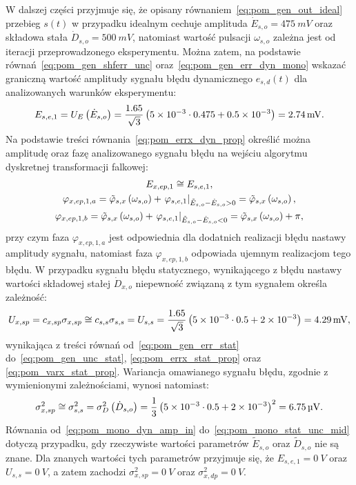 W dalszej części przyjmuje się, że opisany równaniem~\eqref{eq:pom_gen_out_ideal} przebieg $s(t)$ w przypadku idealnym cechuje amplituda $\dot{E}_{s,o} = \qty{475}{mV}$ oraz składowa stała $\dot{D}_{s,o} = \qty{500}{mV}$, natomiast wartość pulsacji $\omega_{s,o}$ zależna jest od iteracji przeprowadzonego eksperymentu. Można zatem, na podstawie równań~\eqref{eq:pom_gen_shferr_unc} oraz~\eqref{eq:pom_gen_err_dyn_mono} wskazać graniczną wartość amplitudy sygnału błędu dynamicznego $e_{s,d}(t)$ dla analizowanych warunków eksperymentu:
\begin{equation}
E_{s,e,1} = U_{E} \left(\dot{E}_{s,o}\right) = \frac{1.65}{\sqrt{3}} \left(\num{5e-3} \cdot 0.475 + \num{0.5e-3}\right) = \qty{2.74}{mV} \label{eq:pom_mono_dyn_amp_in}.
\end{equation}
Na podstawie treści równania~\eqref{eq:pom_errx_dyn_prop} określić można amplitudę oraz fazę analizowanego sygnału błędu na wejściu algorytmu dyskretnej transformacji falkowej:
\begin{gather}
E_{x,ep,1} \cong E_{s,e,1} \label{eq:pom_mono_dyn_prop_amp_mid}, \\
\varphi_{x,ep,1,a} = \tilde{\varphi}_{s,x} \left(\omega_{s,o}\right) + \left. \varphi_{s,e,1} \right|_{\tilde{E}_{s,o} - \dot{E}_{s,o} > 0} = \tilde{\varphi}_{s,x} \left(\omega_{s,o}\right) \label{eq:pom_mono_dyn_prop_phi_mid_a}, \\
\varphi_{x,ep,1,b} = \tilde{\varphi}_{s,x} \left(\omega_{s,o}\right) + \left. \varphi_{s,e,1} \right|_{\tilde{E}_{s,o} - \dot{E}_{s,o} < 0} = \tilde{\varphi}_{s,x} \left(\omega_{s,o}\right) + \pi \label{eq:pom_mono_dyn_prop_phi_mid_b},
\end{gather}
przy czym faza $\varphi_{x,ep,1,a}$ jest odpowiednia dla dodatnich realizacji błędu nastawy amplitudy sygnału, natomiast faza $\varphi_{x,ep,1,b}$ odpowiada ujemnym realizacjom tego błędu. W przypadku sygnału błędu statycznego, wynikającego z błędu nastawy wartości składowej stałej $\dot{D}_{x,o}$ niepewność związaną z tym sygnałem określa zależność:
\begin{equation}
U_{x,sp} = c_{x,sp} \sigma_{x,sp} \cong c_{s,s} \sigma_{s,s} = U_{s,s} = \frac{1.65}{\sqrt{3}} \left(\num{5e-3} \cdot 0.5 + \num{2e-3}\right) = \qty{4.29}{mV} \label{eq:pom_mono_stat_unc_mid},
\end{equation}
wynikająca z treści równań od~\eqref{eq:pom_gen_err_stat} do~\eqref{eq:pom_gen_unc_stat}, \eqref{eq:pom_errx_stat_prop} oraz \eqref{eq:pom_varx_stat_prop}. Wariancja omawianego sygnału błędu, zgodnie z wymienionymi zależnościami, wynosi natomiast:
\begin{equation}
\sigma_{x,sp}^{2} \cong \sigma_{s,s}^{2} = \sigma_{D}^{2} \left(\dot{D}_{s,o}\right) = \frac{1}{3} \left(\num{5e-3} \cdot 0.5 + \num{2e-3}\right)^{2} = \qty{6.75}{\micro V} \label{eq:pom_mono_stat_var_mid}.
\end{equation}
Równania od~\eqref{eq:pom_mono_dyn_amp_in} do~\eqref{eq:pom_mono_stat_unc_mid} dotyczą przypadku, gdy rzeczywiste wartości parametrów $\tilde{E}_{s,o}$ oraz $\tilde{D}_{s,o}$ nie są znane. Dla znanych wartości tych parametrów przyjmuje się, że $E_{s,e,1} = \qty{0}{V}$ oraz $U_{s,s} = \qty{0}{V}$, a zatem zachodzi $\sigma_{x,sp}^{2} = \qty{0}{V}$ oraz $\sigma_{x,dp}^{2} = \qty{0}{V}$.

